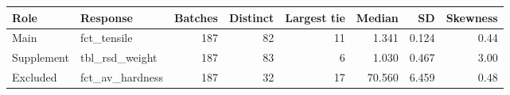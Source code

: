 \begin{tabular}{@{}llrrrrrr@{}}
\toprule
Role & Response & Batches & Distinct & Largest tie & Median & SD & Skewness\\
\midrule
Main & fct\_tensile & 187 & 82 & 11 & 1.341 & 0.124 & 0.44 \\
Supplement & tbl\_rsd\_weight & 187 & 83 & 6 & 1.030 & 0.467 & 3.00 \\
Excluded & fct\_av\_hardness & 187 & 32 & 17 & 70.560 & 6.459 & 0.48 \\
\bottomrule
\end{tabular}
